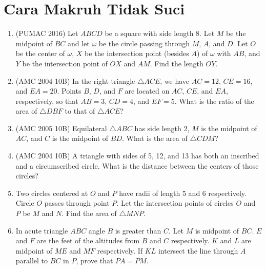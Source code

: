 \documentclass[11pt]{scrartcl}
\begin{document}
\section{Cara Makruh Tidak Suci}
\begin{enumerate}[resume]
    \item (PUMAC 2016) Let $ABCD$ be a square with side length 8. Let $M$ be the midpoint of $BC$ and let $\omega$ be the circle passing through $M$, $A$, and $D$. Let $O$ be the center of $\omega$, $X$ be the intersection point (besides $A$) of $\omega$ with $AB$, and $Y$ be the intersection point of $OX$ and $AM$. Find the length $OY$.

    \item (AMC 2004 10B) In the right triangle $\triangle ACE$, we have $AC = 12$, $CE = 16$, and $EA = 20$. Points $B$, $D$, and $F$ are located on $AC$, $CE$, and $EA$, respectively, so that $AB = 3$, $CD = 4$, and $EF = 5$. What is the ratio of the area of $\triangle DBF$ to that of $\triangle ACE$?

    \item (AMC 2005 10B) Equilateral $\triangle ABC$ has side length 2, $M$ is the midpoint of $AC$, and $C$ is the midpoint of $BD$. What is the area of $\triangle CDM$?

    \item (AMC 2004 10B) A triangle with sides of 5, 12, and 13 has both an inscribed and a circumscribed circle. What is the distance between the centers of those circles?

    \item Two circles centered at $O$ and $P$ have radii of length $5$ and $6$ respectively. Circle $O$ passes through point $P$. Let the intersection points of circles $O$ and $P$ be $M$ and $N$. Find the area of $\triangle MNP$.



    \item In acute triangle $ABC$ angle $B$ is greater than $C$. Let $M$ is midpoint of $BC$. $E$ and $F$ are the feet of the altitudes from $B$ and $C$ respectively. $K$ and $L$ are midpoint of $ME$ and $MF$ respectively. If $KL$ intersect the line through $A$ parallel to $BC$ in $P$, prove that $PA = PM$.


\end{enumerate}
\end{document}
